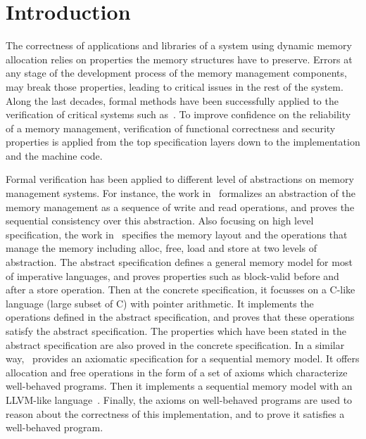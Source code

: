 \section{Introduction}
The correctness of applications and libraries of a system using dynamic memory allocation relies on properties the memory structures have to preserve. Errors at any stage of the development process of the memory management components, may break those properties, leading to critical issues in the rest of the system. Along the last decades, formal methods have been successfully applied to the verification of critical systems such as~\cite{reg_rushby, reg_luu}. To improve confidence on the reliability of a memory management, verification of functional correctness and security properties is applied from the top specification layers down to the implementation and the machine code.

Formal verification has been applied to different level of abstractions on memory management systems. For instance, the work in~\cite{reg_higham} formalizes an abstraction of the memory management as a sequence of write and read operations, and proves the sequential consistency over this abstraction. Also focusing on high level specification, the work in~\cite{reg_blazy} specifies the memory layout and the operations that manage the memory including alloc, free, load and store at two levels of abstraction. The abstract specification defines a general memory model for most of imperative languages, and proves properties such as block-valid before and after a store operation. Then at the concrete specification, it focusses on a C-like language (large subset of C) with pointer arithmetic. It implements the operations defined in the abstract specification, and proves that these operations satisfy the abstract specification. The properties which have been stated in the abstract specification are also proved in the concrete specification. In a similar way,~\cite{reg_mansky} provides an axiomatic specification for a sequential memory model. It offers allocation and free operations in the form of a set of axioms which characterize well-behaved programs. Then it implements a sequential memory model with an LLVM-like language~\cite{reg_chris}. Finally, the axioms on  well-behaved programs are used to reason about the correctness of this implementation, and to prove it satisfies a well-behaved program.

